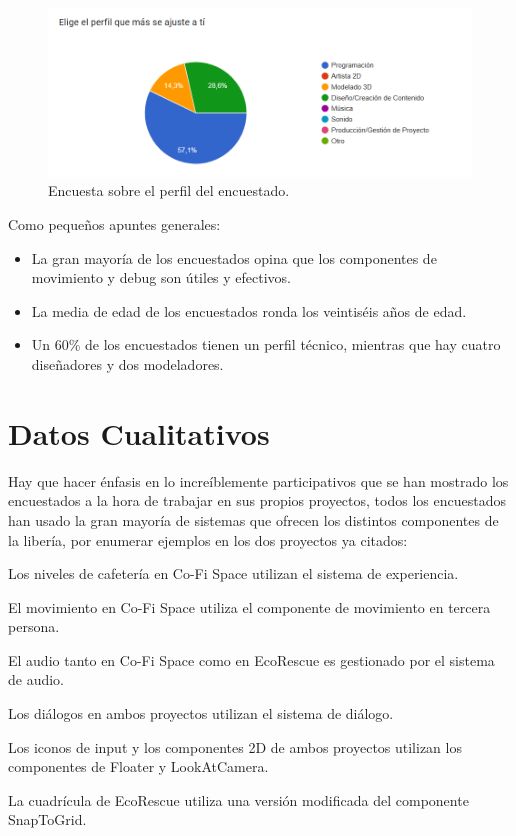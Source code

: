 \begin{figure}[H]
  \centering
  \includegraphics[width=450px,clip=true]{CUESTIONARIO_32.png}
  \caption{Encuesta sobre el perfil del encuestado.}
  \label{fig:CUESTIONARIO_32trucado}
\end{figure}
\raggedbottom

Como pequeños apuntes generales:
\begin{itemize}
    \item La gran mayoría de los encuestados opina que los componentes de movimiento y debug son útiles y efectivos.
    \item La media de edad de los encuestados ronda los veintiséis años de edad.
    \item Un 60\% de los encuestados tienen un perfil técnico, mientras que hay cuatro diseñadores y dos modeladores.
\end{itemize}

\section{Datos Cualitativos}
Hay que hacer énfasis en lo increíblemente participativos que se han mostrado los encuestados a la hora de trabajar en sus propios proyectos, todos los encuestados han usado la gran mayoría de sistemas que ofrecen
los distintos componentes de la libería, por enumerar ejemplos en los dos proyectos ya citados:
\begin{compactitem}
    \item Los niveles de cafetería en Co-Fi Space utilizan el sistema de experiencia.
    \item El movimiento en Co-Fi Space utiliza el componente de movimiento en tercera persona.
    \item El audio tanto en Co-Fi Space como en EcoRescue es gestionado por el sistema de audio.
    \item Los diálogos en ambos proyectos utilizan el sistema de diálogo.
    \item Los iconos de input y los componentes 2D de ambos proyectos utilizan los componentes de Floater y LookAtCamera.
    \item La cuadrícula de EcoRescue utiliza una versión modificada del componente SnapToGrid. 
\end{compactitem}


